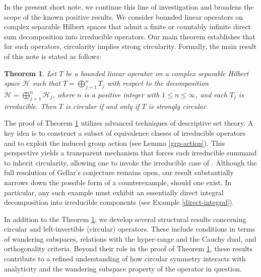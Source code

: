 \documentclass[10pt,a4paper]{amsart}
\newtheorem{theorem}{Theorem}[section]
\begin{document}
In the present short note, we continue this line of investigation and broadens the scope of the known positive results. We consider bounded linear operators on complex separable Hilbert spaces that admit a finite or countably infinite direct sum decomposition into irreducible operators. Our main theorem establishes that for such operators, circularity implies strong circularity. Formally, the main result of this note is stated as follows:


\begin{theorem}\label{main-thm}
Let $T$ be a bounded linear operator on a complex separable Hilbert space $\mathcal H$ such that $T = \bigoplus_{j=1}^n T_j$ with respect to the decomposition $\mathcal H = \bigoplus_{j=1}^n \mathcal H_j$, where $n$ is a positive integer with $1 \leqslant n \leqslant \infty$, and each $T_j$ is irreducible. Then $T$ is circular if and only if $T$ is strongly circular.
\end{theorem}


The proof of Theorem \ref{main-thm} utilizes advanced techniques of descriptive set theory. A key idea is to construct a subset of equivalence classes of irreducible operators and to exploit the induced group action (see Lemma \ref{grp-action}). This perspective yields a transparent mechanism that forces each irreducible summand to inherit circularity, allowing one to invoke the irreducible case of \cite{AHHK}. Although the full resolution of Gellar’s conjecture remains open, our result substantially narrows down the possible form of a counterexample, should one exist. In particular, any such example must exhibit an essentially direct integral decomposition into irreducible components (see Example \ref{direct-integral}). 


In addition to the Theorem \ref{main-thm}, we develop several structural results concerning circular and left-invertible (circular) operators. These include conditions in terms of wandering subspaces, relations with the hyper-range and the Cauchy dual, and orthogonality criteria. Beyond their role in the proof of Theorem \ref{main-thm}, these results contribute to a refined understanding of how circular symmetry interacts with analyticity and the wandering subspace property of the operator in question.
\end{document}
